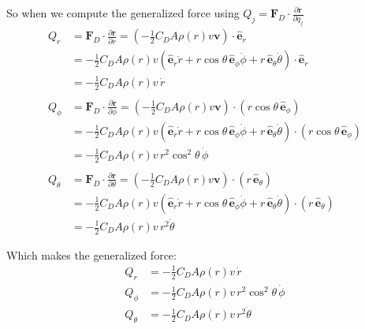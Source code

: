 \documentclass[titlepage]{article}
\begin{document}
So when we compute the generalized force using $Q_j=\boldsymbol{F}_D\cdot\frac{\partial\boldsymbol{r}}{\partial q_j}$
\begin{equation}
	\begin{split}
		Q_r&=\boldsymbol{F}_D\cdot\frac{\partial\boldsymbol{r}}{\partial r}=\left(-\frac{1}{2}C_DA\rho(r)v\boldsymbol{v}\right)\cdot\hat{\boldsymbol{e}}_r \\
		&=-\frac{1}{2}C_DA\rho(r)v\left(\hat{\boldsymbol{e}}_r\dot{r}+r\cos\theta\,\hat{\boldsymbol{e}}_\phi\dot{\phi}+r\,\hat{\boldsymbol{e}}_\theta\dot{\theta}\right)\cdot\hat{\boldsymbol{e}}_r \\
		&=-\frac{1}{2}C_DA\rho(r)v\,\dot{r} \\
		\\
		Q_\phi&=\boldsymbol{F}_D\cdot\frac{\partial\boldsymbol{r}}{\partial\phi}=\left(-\frac{1}{2}C_DA\rho(r)v\boldsymbol{v}\right)\cdot\left(r\cos\theta\,\hat{\boldsymbol{e}}_\phi\right) \\
		&=-\frac{1}{2}C_DA\rho(r)v\left(\hat{\boldsymbol{e}}_r\dot{r}+r\cos\theta\,\hat{\boldsymbol{e}}_\phi\dot{\phi}+r\,\hat{\boldsymbol{e}}_\theta\dot{\theta}\right)\cdot\left(r\cos\theta\,\hat{\boldsymbol{e}}_\phi\right) \\
		&=-\frac{1}{2}C_DA\rho(r)v\,r^2\cos^2\theta\,\dot{\phi} \\
		\\
		Q_\theta&=\boldsymbol{F}_D\cdot\frac{\partial\boldsymbol{r}}{\partial\theta}=\left(-\frac{1}{2}C_DA\rho(r)v\boldsymbol{v}\right)\cdot\left(r\,\hat{\boldsymbol{e}}_\theta\right) \\
		&=-\frac{1}{2}C_DA\rho(r)v\left(\hat{\boldsymbol{e}}_r\dot{r}+r\cos\theta\,\hat{\boldsymbol{e}}_\phi\dot{\phi}+r\,\hat{\boldsymbol{e}}_\theta\dot{\theta}\right)\cdot\left(r\,\hat{\boldsymbol{e}}_\theta\right) \\
		&=-\frac{1}{2}C_DA\rho(r)v\,r^2\dot{\theta}
	\end{split}
\end{equation}

\begin{mdframed}[linewidth=1pt, innertopmargin=10pt, innerbottommargin=10pt]
	Which makes the generalized force:
	\begin{equation}
		\begin{split}
			Q_r&=-\frac{1}{2}C_DA\rho(r)v\,\dot{r} \\
			Q_\phi&=-\frac{1}{2}C_DA\rho(r)v\,r^2\cos^2\theta\,\dot{\phi} \\
			Q_\theta&=-\frac{1}{2}C_DA\rho(r)v\,r^2\dot{\theta}
		\end{split}
		\label{eq:forcenc}
	\end{equation}
\end{mdframed}
\end{document}
